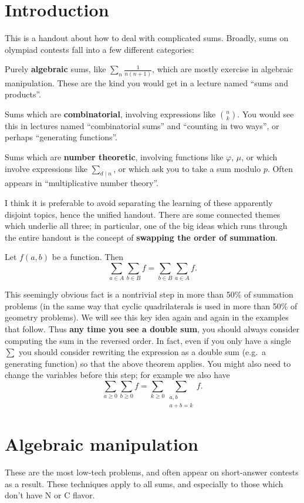 \documentclass[11pt]{scrartcl}
\begin{document}
\section{Introduction}
This is a handout about how to deal with complicated sums.
Broadly, sums on olympiad contests fall into a few different categories:
\begin{itemize}
	\ii Purely \textbf{algebraic} sums, like $\sum_n \frac{1}{n(n+1)}$,
	which are mostly exercise in algebraic manipulation.
	These are the kind you would get in a lecture named ``sums and products''.

	\ii Sums which are \textbf{combinatorial}, involving expressions like $\binom nk$.
	You would see this in lectures named ``combinatorial sums''
	and ``counting in two ways'', or perhaps ``generating functions''.

	\ii Sums which are \textbf{number theoretic}, involving functions like
	$\varphi$, $\mu$, or which involve expressions like $\sum_{d \mid n}$,
	or which ask you to take a sum modulo $p$.
	Often appears in ``multiplicative number theory''.
\end{itemize}
I think it is preferable to avoid separating the learning of these
apparently disjoint topics, hence the unified handout.
There are some connected themes which underlie all three;
in particular, one of the big ideas which runs through the entire
handout is the concept of \textbf{swapping the order of summation}.
\begin{theorem}
	Let $f(a,b)$ be a function. Then
	\[ \sum_{a \in A} \sum_{b \in B} f = \sum_{b \in B} \sum_{a \in A} f. \]
\end{theorem}
This seemingly obvious fact is a nontrivial step in more than 50\%
of summation problems (in the same way that cyclic quadrilaterals is used
in more than 50\% of geometry problems).
We will see this key idea again and again in the examples that follow.
Thus \textbf{any time you see a double sum}, you should always consider
computing the sum in the reversed order.
In fact, even if you only have a single $\sum$ you should consider rewriting
the expression as a double sum (e.g.\ a generating function)
so that the above theorem applies.
You might also need to change the variables before this step; for example we also have
\[ \sum_{a \ge 0} \sum_{b \ge 0} f = \sum_{k \ge 0} \sum_{\substack{a,b \\ a+b=k}} f. \]


\section{Algebraic manipulation}
These are the most low-tech problems,
and often appear on short-answer contests as a result. 
These techniques apply to all sums, and especially to those
which don't have N or C flavor.
\end{document}
